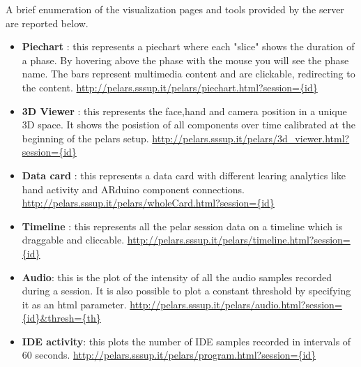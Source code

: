 \documentclass[a4paper,notitlepage,onecolumn]{hitec}  %
\begin{document}
A brief enumeration of the visualization pages and tools provided by the server are reported below.
\begin{itemize}
\item\textbf{Piechart} : this represents a piechart where each "slice" shows the duration of a phase. By hovering above the phase with the mouse you will see the phase name. The bars represent multimedia content and are clickable, redirecting to the content. \url{http://pelars.sssup.it/pelars/piechart.html?session={id}}
\item\textbf{3D Viewer} : this represents the face,hand and camera position in a unique 3D space. It shows the posistion of all components over time calibrated at the beginning of the pelars setup. \url{http://pelars.sssup.it/pelars/3d_viewer.html?session={id}}
\item\textbf{Data card} : this represents a data card with different learing analytics like hand activity and ARduino component connections. \url{http://pelars.sssup.it/pelars/wholeCard.html?session={id}}
\item\textbf{Timeline} : this represents all the pelar session data on a timeline which is draggable and cliccable. \url{http://pelars.sssup.it/pelars/timeline.html?session={id}}
\item\textbf{Audio}: this is the plot of the intensity of all the audio samples recorded during a session. It is also possible to plot a constant threshold by specifying it as an html parameter. \url{http://pelars.sssup.it/pelars/audio.html?session={id}&thresh={th}}
\item\textbf{IDE activity}: this plots the number of IDE samples recorded in intervals of 60 seconds. \url{http://pelars.sssup.it/pelars/program.html?session={id}}
\end{itemize}
\end{document}
